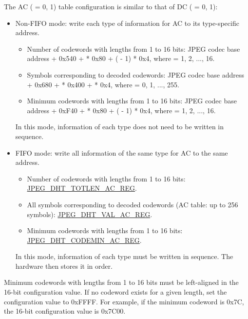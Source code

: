 \documentclass[main\_\_EN.tex]{subfiles}
\begin{document}
The AC ( = 0, 1) table configuration is similar to that of DC ( = 0, 1):

\begin{itemize}
    \item Non-FIFO mode: write each type of information for AC to its type-specific address.
    \begin{itemize}
        \item Number of codewords with lengths from 1 to 16 bits: JPEG codec base address + 0x540 +  * 0x80 + ( - 1) * 0x4, where  = 1, 2, ..., 16.
        \item Symbols corresponding to decoded codewords: JPEG codec base address + 0x680 +  * 0x400 +  * 0x4, where  = 0, 1, ..., 255.
        \item Minimum codewords with lengths from 1 to 16 bits: JPEG codec base address + 0xF40 +  * 0x80 + ( - 1) * 0x4, where  = 1, 2, ..., 16.
    \end{itemize}
    In this mode, information of each type does not need to be written in sequence.
    \item FIFO mode: write all information of the same type for AC to the same address.
    \begin{itemize}
        \item Number of codewords with lengths from 1 to 16 bits: \hyperref[regdesc:JPEGDHTTOTLENAC0REG]{JPEG\_DHT\_TOTLEN\_AC\_REG}.
        \item All symbols corresponding to decoded codewords (AC table: up to 256 symbols): \hyperref[regdesc:JPEGDHTVALAC0REG]{JPEG\_DHT\_VAL\_AC\_REG}.
        \item Minimum codewords with lengths from 1 to 16 bits: \hyperref[regdesc:JPEGDHTCODEMINAC0REG]{JPEG\_DHT\_CODEMIN\_AC\_REG}.
    \end{itemize}
    In this mode, information of each type must be written in sequence. The hardware then stores it in order.
\end{itemize}

Minimum codewords with lengths from 1 to 16 bits must be left-aligned in the 16-bit configuration value. If no codeword exists for a given length, set the configuration value to 0xFFFF. For example, if the minimum codeword is 0x7C, the 16-bit configuration value is 0x7C00.
\end{document}
